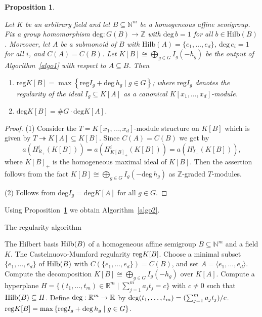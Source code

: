 \documentclass[11pt,a4paper]{amsart}%
\newtheorem{proposition}[theorem]{Proposition}
\theoremstyle{definition}
\theoremstyle{remark}
\numberwithin{equation}{section}
\theoremstyle{plain}
\newcommand{\erz}[1]{\langle#1\rangle}
\newcommand{\maxk}[1]{\left\{#1\right\}}
\begin{document}
\begin{proposition}
\label{regcomp}

Let $K$ be an arbitrary field and let $B\subseteq\mathbb{N}^{m}$ be a
homogeneous affine semigroup. Fix a group homomorphism $\mathrm{deg}:
G(B)\rightarrow\mathbb{Z}$ with $\mathrm{deg}\, b=1$ for all $b\in
\mathrm{Hilb}(B)$. Moreover, let $A$ be a submonoid of $B$ with $\mathrm{Hilb}%
(A)=\{e_{1},\ldots,e_{d}\}$, $\mathrm{deg}\, e_{i}=1$ for all $i$, and
$C(A)=C(B)$. Let $K[B]\cong\bigoplus_{g\in G} I_{g} (-h_{g})$ be the output of
Algorithm~\ref{algo1} with respect to $A\subseteq B$. Then

\begin{enumerate}
\item $\mathrm{reg}K[B] = \max\left\{ \mathrm{reg}I_{g} + \mathrm{deg}%
\,h_{g}\mid g\in G\right\} $; where $\mathrm{reg} I_{g}$ denotes the
regularity of the ideal $I_{g}\subseteq K[A]$ as a canonical $K[x_{1}%
,\ldots,x_{d}]$-module.

\item $\mathrm{deg}K[B] = \#G \cdot\mathrm{deg}K[A]$.
\end{enumerate}
\end{proposition}

\begin{proof}
(1) Consider the $T=K[x_{1},\ldots,x_{d}]$-module structure on $K[B]$ which is
given by $T\twoheadrightarrow K[A]\subseteq K[B]$. Since $C(A)=C(B)$ we get by
\cite[Theorem\,13.1.6]{BSLC}
\[
a(H^{i}_{R_{+}}(K[B]))=a(H^{i}_{K[B]_{+}}(K[B]))=a(H^{i}_{T_{+}}(K[B])),
\]
where $K[B]_{+}$ is the homogeneous maximal ideal of $K[B]$. Then the
assertion follows from the fact $K[B]\cong\bigoplus_{g\in G} I_{g}
(-\mathrm{deg}\,h_{g})$ as $\mathbb{Z}$-graded $T$-modules.

(2) Follows from $\mathrm{deg}I_{g}=\mathrm{deg}K[A]$ for all $g\in G$.
\end{proof}

Using Proposition~\ref{regcomp} we obtain Algorithm~\ref{algo2}.

\begin{algorithm}[H]
\caption{The regularity algorithm}
\label{algo2}
\begin{algorithmic}[1]
\REQUIRE The Hilbert basis ${\rm Hilb}(B)$ of a homogeneous affine semigroup $B\subseteq \mathbb N^m$ and a field $K$.
\ENSURE The Castelnuovo-Mumford regularity ${\rm reg}K[B]$.
\STATE Choose a minimal subset $\{e_1,\ldots,e_d\}$ of ${\rm Hilb}(B)$ with $C(\{e_1,\ldots,e_d\})=C(B)$, and set $A=\erz{e_1,\ldots,e_d}$.
\STATE Compute the decomposition $K[B]\cong\bigoplus_{g\in G} I_g(-h_g)$ over $K[A]$.
\STATE Compute a hyperplane $H=\{(t_1,\ldots,t_m)\in\mathbb R^m \mid \sum_{j=1}^m a_jt_j =c\}$ with $c\not=0$ such that ${\rm Hilb}(B)\subseteq H$. Define ${\rm deg}:\mathbb R^m\rightarrow\mathbb R$ by ${\rm deg} (t_1,\ldots,t_m) = (\sum_{j=1}^m a_jt_j)/c$.
\RETURN ${\rm reg}K[B] = \max\maxk{{\rm reg}I_g + {\rm deg}\,h_g\mid g\in G}$.
\end{algorithmic}
\end{algorithm}
\end{document}
